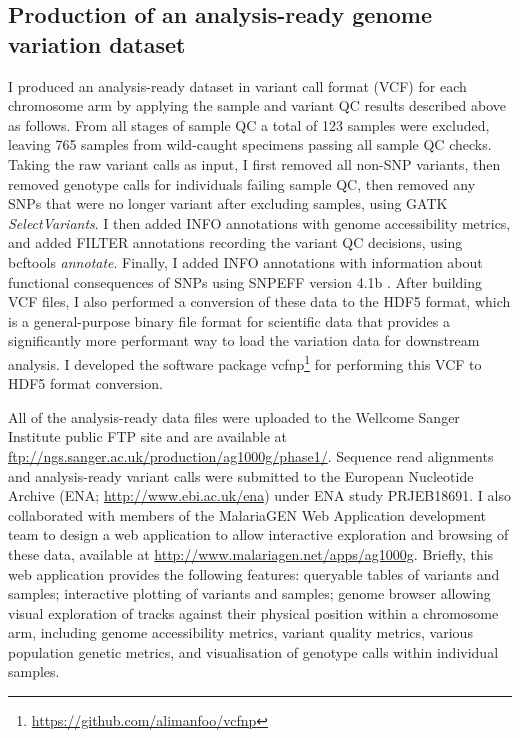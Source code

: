 \documentclass[a4paper,11pt,abstracton,hidelinks]{scrartcl}
\begin{document}
\subsection{Production of an analysis-ready genome variation dataset}


I produced an analysis-ready dataset in variant call format (VCF) for each chromosome arm by applying the sample and variant QC results described above as follows.
%
From all stages of sample QC a total of 123 samples were excluded, leaving 765 samples from wild-caught specimens passing all sample QC checks.
%
Taking the raw variant calls as input, I first removed all non-SNP variants, then removed genotype calls for individuals failing sample QC, then removed any SNPs that were no longer variant after excluding samples, using GATK \textit{SelectVariants}.
%
I then added INFO annotations with genome accessibility metrics, and added FILTER annotations recording the variant QC decisions, using bcftools \textit{annotate}.
%
Finally, I added INFO annotations with information about functional consequences of SNPs using SNPEFF version 4.1b \citep{Cingolani2012}.
%
After building VCF files, I also performed a conversion of these data to the HDF5 format, which is a general-purpose binary file format for scientific data that provides a significantly more performant way to load the variation data for downstream analysis.
%
I developed the software package vcfnp\footnote{\url{https://github.com/alimanfoo/vcfnp}} for performing this VCF to HDF5 format conversion.


All of the analysis-ready data files were uploaded to the Wellcome Sanger Institute public FTP site and are available at \url{ftp://ngs.sanger.ac.uk/production/ag1000g/phase1/}.
%
Sequence read alignments and analysis-ready variant calls were submitted to the European Nucleotide Archive (ENA; \url{http://www.ebi.ac.uk/ena}) under ENA study PRJEB18691.
%
I also collaborated with members of the MalariaGEN Web Application development team to design a web application to allow interactive exploration and browsing of these data, available at \url{http://www.malariagen.net/apps/ag1000g}.
%
Briefly, this web application provides the following features: queryable tables of variants and samples; interactive plotting of variants and samples; genome browser allowing visual exploration of tracks against their physical position within a chromosome arm, including genome accessibility metrics, variant quality metrics, various population genetic metrics, and visualisation of genotype calls within individual samples.
\end{document}
